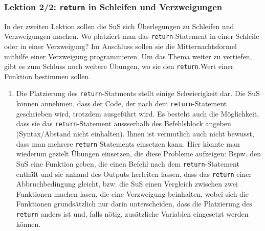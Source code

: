 \begin{myExBox}[title=DL \themycounter]
\subsubsection*{Lektion 2/2: \lstinline|return| in Schleifen und Verzweigungen}
In der zweiten Lektion sollen die SuS sich Überlegungen zu Schleifen und Verzweigungen machen. Wo platziert man das \lstinline|return|-Statement in einer Schleife oder in einer Verzweigung? Im Anschluss sollen sie die Mitternachtsformel mithilfe einer Verzweigung programmieren. Um das Thema weiter zu vertiefen, gibt es zum Schluss noch weitere Übungen, wo sie den \lstinline|return|.Wert einer Funktion bestimmen sollen.

\begin{myExBox}[title=Mögliche Schwierigkeiten \& geeignete Massnahmen]
\begin{enumerate}
    \item Die Platzierung des \lstinline|return|-Statments stellt einige Schwierigkeit dar. Die SuS können annehmen, dass der Code, der nach dem \lstinline|return|-Statement geschrieben wird, trotzdem ausgeführt wird. Es besteht auch die Möglichkeit, dass sie das \lstinline|return|-Statement aussserhalb des Befehlsblock angeben (Syntax/Abstand nicht einhalten). Ihnen ist vermutlich auch nicht bewusst, dass man mehrere \lstinline|return| Statements einsetzen kann.  Hier könnte man wiederum gezielt Übungen einsetzen, die diese Probleme aufzeigen: Bspw. den SuS eine Funktion geben, die einen Befehl nach dem \lstinline|return|-Statement enthält und sie anhand des Outputs herleiten lassen, dass das \lstinline|return| einer Abbruchbedingung gleicht, bzw. die SuS einen Vergleich zwischen zwei Funktionen machen lasen, die eine Verzweigung beinhalten, wobei sich die Funktionen grundsätzlich nur darin unterscheiden, dass die Platzierung des \lstinline|return| anders ist und, falls nötig, zusätzliche Variablen eingesetzt werden können.
\end{enumerate}
\end{myExBox}
\end{myExBox}
\newpage{}

